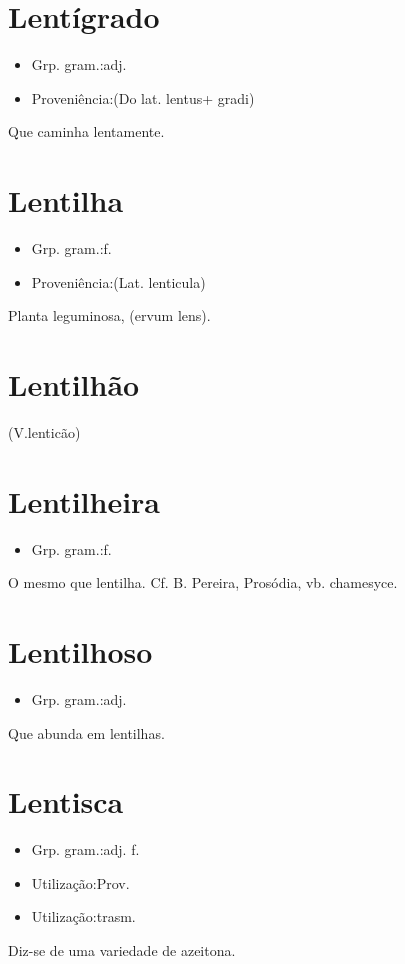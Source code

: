 \section{Lentígrado}
\begin{itemize}
\item {Grp. gram.:adj.}
\end{itemize}
\begin{itemize}
\item {Proveniência:(Do lat. \textunderscore lentus\textunderscore  + \textunderscore gradi\textunderscore )}
\end{itemize}
Que caminha lentamente.
\section{Lentilha}
\begin{itemize}
\item {Grp. gram.:f.}
\end{itemize}
\begin{itemize}
\item {Proveniência:(Lat. \textunderscore lenticula\textunderscore )}
\end{itemize}
Planta leguminosa, (\textunderscore ervum lens\textunderscore ).
\section{Lentilhão}
(V.lenticão)
\section{Lentilheira}
\begin{itemize}
\item {Grp. gram.:f.}
\end{itemize}
O mesmo que \textunderscore lentilha\textunderscore . Cf. B. Pereira, \textunderscore Prosódia\textunderscore , vb. \textunderscore chamesyce\textunderscore .
\section{Lentilhoso}
\begin{itemize}
\item {Grp. gram.:adj.}
\end{itemize}
Que abunda em lentilhas.
\section{Lentisca}
\begin{itemize}
\item {Grp. gram.:adj. f.}
\end{itemize}
\begin{itemize}
\item {Utilização:Prov.}
\end{itemize}
\begin{itemize}
\item {Utilização:trasm.}
\end{itemize}
Diz-se de uma variedade de azeitona.
